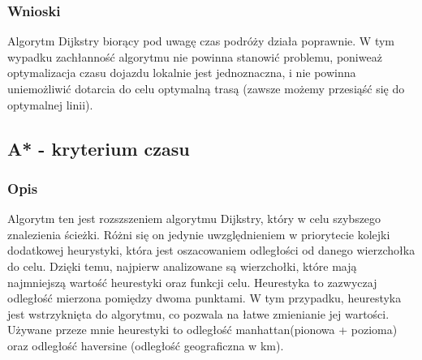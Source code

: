 \documentclass[a4paper, 12pt]{article}
\begin{document}
  \subsubsection{Wnioski} Algorytm Dijkstry biorący pod uwagę czas podróży działa poprawnie.
  W tym wypadku zachłanność algorytmu nie powinna stanowić problemu, poniweaż 
  optymalizacja czasu dojazdu lokalnie jest jednoznaczna, i nie powinna uniemożliwić dotarcia do celu 
  optymalną trasą (zawsze możemy przesiąść się do optymalnej linii).

  \subsection{A* - kryterium czasu}

  \subsubsection{Opis}
  Algorytm ten jest rozszszeniem algorytmu Dijkstry, który w celu szybszego znalezienia 
  ścieżki. Różni się on jedynie uwzględnieniem w priorytecie kolejki dodatkowej heurystyki,
  która jest oszacowaniem odległości od danego wierzchołka do celu. Dzięki temu, najpierw analizowane 
  są wierzchołki, które mają najmniejszą wartość heurestyki oraz funkcji celu.
  Heurestyka to zazwyczaj odległość mierzona pomiędzy dwoma punktami. W tym przypadku,
  heurestyka jest wstrzyknięta do algorytmu, co pozwala na łatwe zmienianie jej wartości.
  Używane przeze mnie heurestyki to odległość manhattan(pionowa + pozioma) oraz odległość haversine
  (odległość geograficzna w km).
\end{document}

